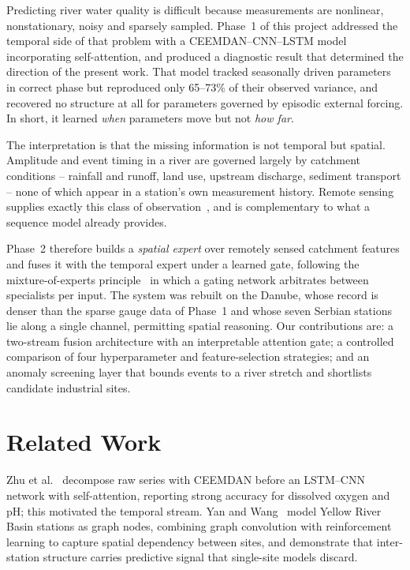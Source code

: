 \documentclass[conference]{IEEEtran}
\begin{document}
Predicting river water quality is difficult because measurements are nonlinear,
nonstationary, noisy and sparsely sampled. Phase~1 of this project addressed
the temporal side of that problem with a CEEMDAN--CNN--LSTM model incorporating
self-attention, and produced a diagnostic result that determined the direction
of the present work. That model tracked seasonally driven parameters in correct
phase but reproduced only 65--73\% of their observed variance, and recovered no
structure at all for parameters governed by episodic external forcing. In
short, it learned \emph{when} parameters move but not \emph{how far}.

The interpretation is that the missing information is not temporal but spatial.
Amplitude and event timing in a river are governed largely by catchment
conditions -- rainfall and runoff, land use, upstream discharge, sediment
transport -- none of which appear in a station's own measurement history.
Remote sensing supplies exactly this class of
observation~\cite{gholizadeh,sagan,pahlevan}, and is complementary to what a
sequence model already provides.

Phase~2 therefore builds a \emph{spatial expert} over remotely sensed
catchment features and fuses it with the temporal expert under a learned gate,
following the mixture-of-experts principle~\cite{jacobs} in which a gating
network arbitrates between specialists per input. The system was rebuilt on the
Danube, whose record is denser than the sparse gauge data of Phase~1 and whose
seven Serbian stations lie along a single channel, permitting spatial
reasoning. Our contributions are: a two-stream fusion architecture with an interpretable
attention gate; a controlled comparison of four hyperparameter and
feature-selection strategies; and an anomaly screening layer that bounds events
to a river stretch and shortlists candidate industrial sites.

\section{Related Work}

Zhu et al.~\cite{zhu} decompose raw series with CEEMDAN before an LSTM--CNN
network with self-attention, reporting strong accuracy for dissolved oxygen and
pH; this motivated the temporal stream. Yan and Wang~\cite{yan} model Yellow
River Basin stations as graph nodes, combining graph convolution with
reinforcement learning to capture spatial dependency between sites, and
demonstrate that inter-station structure carries predictive signal that
single-site models discard.
\end{document}
